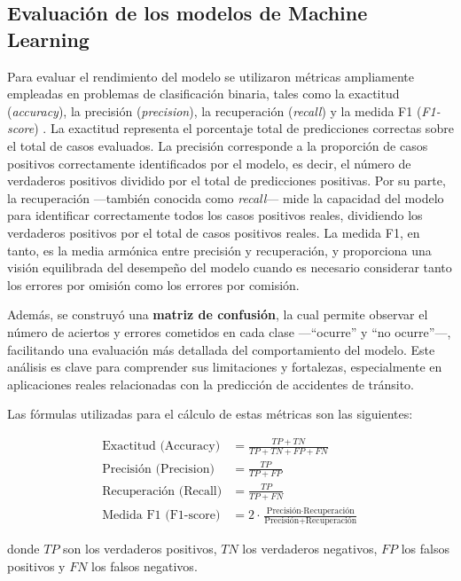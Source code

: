 \documentclass[12pt]{article}
\begin{document}
\subsection{Evaluación de los modelos de Machine Learning}

Para evaluar el rendimiento del modelo se utilizaron métricas ampliamente empleadas en problemas de clasificación binaria, tales como la exactitud (\textit{accuracy}), la precisión (\textit{precision}), la recuperación (\textit{recall}) y la medida F1 (\textit{F1-score}) \parencite{manning2008}.
La exactitud representa el porcentaje total de predicciones correctas sobre el total de casos evaluados.
La precisión corresponde a la proporción de casos positivos correctamente identificados por el modelo, es decir, el número de verdaderos positivos dividido por el total de predicciones positivas.
Por su parte, la recuperación —también conocida como \textit{recall}— mide la capacidad del modelo para identificar correctamente todos los casos positivos reales, dividiendo los verdaderos positivos por el total de casos positivos reales.
La medida F1, en tanto, es la media armónica entre precisión y recuperación, y proporciona una visión equilibrada del desempeño del modelo cuando es necesario considerar tanto los errores por omisión como los errores por comisión.

Además, se construyó una \textbf{matriz de confusión}, la cual permite observar el número de aciertos y errores cometidos en cada clase —“ocurre” y “no ocurre”—, facilitando una evaluación más detallada del comportamiento del modelo.
Este análisis es clave para comprender sus limitaciones y fortalezas, especialmente en aplicaciones reales relacionadas con la predicción de accidentes de tránsito.

Las fórmulas utilizadas para el cálculo de estas métricas son las siguientes:

\[
\begin{aligned}
\text{Exactitud (Accuracy)} &= \frac{TP + TN}{TP + TN + FP + FN} \\
\text{Precisión (Precision)} &= \frac{TP}{TP + FP} \\
\text{Recuperación (Recall)} &= \frac{TP}{TP + FN} \\
\text{Medida F1 (F1-score)} &= 2 \cdot \frac{\text{Precisión} \cdot \text{Recuperación}}{\text{Precisión} + \text{Recuperación}}
\end{aligned}
\]

donde \( TP \) son los verdaderos positivos, \( TN \) los verdaderos negativos, \( FP \) los falsos positivos y \( FN \) los falsos negativos.
\end{document}
